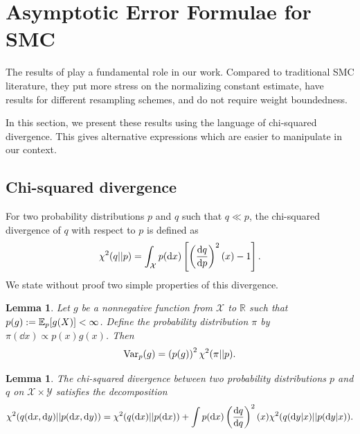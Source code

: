 \documentclass{article}
\theoremstyle{plain}
\newtheorem{lemma}[theorem]{Lemma}
\theoremstyle{definition}
\theoremstyle{remark}
\begin{document}
\section{Asymptotic Error Formulae for SMC}
\label{sec:webber_presentation}
The results of \citet{webber2019unifying} play a fundamental role in our work. Compared to traditional SMC literature, they put more stress on the normalizing constant estimate, have results for different resampling schemes, and do not require weight boundedness.

In this section, we present these results using the language of chi-squared divergence. This gives alternative expressions which are easier to manipulate in our context.
\subsection{Chi-squared divergence}
For two probability distributions $p$ and $q$ such that $q \ll p$, the chi-squared divergence of $q$ with respect to $p$ is defined as
\begin{equation*}
	\chi^2(q||p) = \int_{\mathcal X} p(\dd x) \left[ \left( \frac{\dd q}{\dd p} \right)^2(x) - 1 \right].
\end{equation*}
We state without proof two simple properties of this divergence.
\begin{lemma}
	\label{lem:chisqvar}
	Let $g$ be a nonnegative function from $\mathcal X$ to $\mathbb R$ such that $p(g):=\mathbb{E}_p[g(X)] < \infty$. Define the probability distribution $\pi$ by $\pi(\dd x) \propto p(x)g(x)$. Then
	\begin{equation*}
		\operatorname{Var}_p(g) = \left( p(g) \right)^2 \chi^2(\pi||p).
	\end{equation*}
\end{lemma}

\begin{lemma}
	\label{lem:chisq_chainrule}
	The chi-squared divergence between two probability distributions $p$ and $q$ on $\mathcal X \times \mathcal Y$ satisfies the decomposition
	\begin{equation*}
		\chi^2(q(\dd x, \dd y)||p(\dd x, \dd y)) = \chi^2(q(\dd x)||p(\dd x)) + \int p(\dd x) \left( \frac{\dd q}{\dd q} \right)^2(x) \chi^2(q(\dd y|x)||p(\dd y|x)).
	\end{equation*}
\end{lemma}
\end{document}
